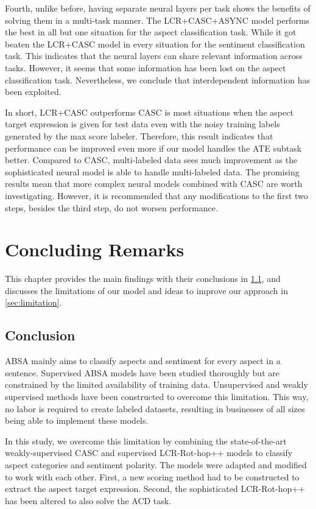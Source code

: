 \documentclass[american, oneside]{ecsgdp}
\begin{document}
Fourth, unlike before, having separate neural layers per task shows the benefits of solving them in a multi-task manner. The LCR+CASC+ASYNC model performs the best in all but one situation for the aspect classification task. While it got beaten the LCR+CASC model in every situation for the sentiment classification task. This indicates that the neural layers can share relevant information across tasks. However, it seems that some information has been lost on the aspect classification task. Nevertheless, we conclude that interdependent information has been exploited.

In short, LCR+CASC outperforms CASC is most situations when the aspect target expression is given for test data even with the noisy training labels generated by the max score labeler. Therefore, this result indicates that performance can be improved even more if our model handles the ATE subtask better. Compared to CASC, multi-labeled data sees much improvement as the sophisticated neural model is able to handle multi-labeled data. The promising results mean that more complex neural models combined with CASC are worth investigating. However, it is recommended that any modifications to the first two steps, besides the third step, do not worsen performance. 

\chapter{Concluding Remarks} \label{chap:remarks}
This chapter provides the main findings with their conclusions in \cref{sec:conclusion}, and discusses the limitations of our model and ideas to improve our approach in \cref{sec:limitation}.

\section{Conclusion} \label{sec:conclusion}
ABSA mainly aims to classify aspects and sentiment for every aspect in a sentence. Supervised ABSA models have been studied thoroughly but are constrained by the limited availability of training data. Unsupervised and weakly supervised methods have been constructed to overcome this limitation. This way, no labor is required to create labeled datasets, resulting in businesses of all sizes being able to implement these models.

In this study, we overcome this limitation by combining the state-of-the-art weakly-supervised CASC \parencite{Kumar2021CASC} and supervised LCR-Rot-hop++ \parencite{Trusca2020HAABSA++} models to classify aspect categories and sentiment polarity. The models were adapted and modified to work with each other. First, a new scoring method had to be constructed to extract the aspect target expression. Second, the sophisticated LCR-Rot-hop++ has been altered to also solve the ACD task.
\end{document}
